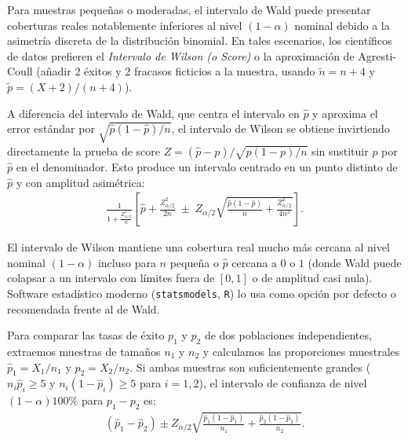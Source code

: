 \begin{observacion}
	Para muestras pequeñas o moderadas, el intervalo de Wald puede presentar coberturas reales notablemente inferiores al nivel $(1-\alpha)$ nominal debido a la asimetría discreta de la distribución binomial. En tales escenarios, los científicos de datos prefieren el \emph{Intervalo de Wilson (o Score)} o la aproximación de Agresti-Coull (añadir 2 éxitos y 2 fracasos ficticios a la muestra, usando $\tilde{n} = n + 4$ y $\tilde{p} = (X+2)/(n+4)$).
\end{observacion}

\begin{teorema}
	A diferencia del intervalo de Wald, que centra el intervalo en $\hat{p}$ y aproxima el error estándar por $\sqrt{\hat p(1-\hat p)/n}$, el intervalo de Wilson se obtiene invirtiendo directamente la prueba de score $Z = (\hat{p}-p)/\sqrt{p(1-p)/n}$ sin sustituir $p$ por $\hat{p}$ en el denominador. Esto produce un intervalo centrado en un punto distinto de $\hat p$ y con amplitud asimétrica:
	\begin{align}
		\frac{1}{1+\frac{Z_{\alpha/2}^2}{n}}\left[\hat{p} + \frac{Z_{\alpha/2}^2}{2n} \;\pm\; Z_{\alpha/2}\sqrt{\frac{\hat{p}(1-\hat{p})}{n} + \frac{Z_{\alpha/2}^2}{4n^2}}\right].
	\end{align}
\end{teorema}

\begin{observacion}
	El intervalo de Wilson mantiene una cobertura real mucho más cercana al nivel nominal $(1-\alpha)$ incluso para $n$ pequeña o $\hat p$ cercana a $0$ o $1$ (donde Wald puede colapsar a un intervalo con límites fuera de $[0,1]$ o de amplitud casi nula). Software estadístico moderno (\texttt{statsmodels}, \texttt{R}) lo usa como opción por defecto o recomendada frente al de Wald.
\end{observacion}

\begin{teorema}
	Para comparar las tasas de éxito $p_1$ y $p_2$ de dos poblaciones independientes, extraemos muestras de tamaños $n_1$ y $n_2$ y calculamos las proporciones muestrales $\hat{p}_1 = X_1/n_1$ y $\hat{p}_2 = X_2/n_2$. Si ambas muestras son suficientemente grandes ($n_i\hat{p}_i \geq 5$ y $n_i(1-\hat{p}_i) \geq 5$ para $i=1,2$), el intervalo de confianza de nivel $(1-\alpha)100\%$ para $p_1 - p_2$ es:
	\begin{align}
		(\hat{p}_1 - \hat{p}_2) \pm Z_{\alpha/2} \sqrt{\frac{\hat{p}_1(1-\hat{p}_1)}{n_1} + \frac{\hat{p}_2(1-\hat{p}_2)}{n_2}}.
	\end{align}
\end{teorema}

